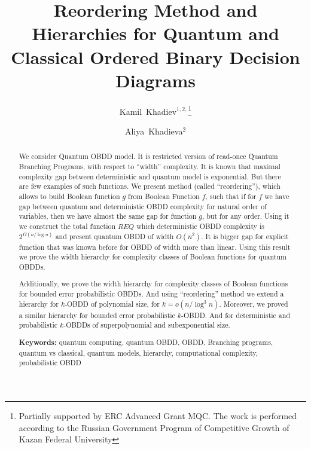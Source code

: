 \documentclass{llncs}
\begin{document}
\title{Reordering Method and Hierarchies for Quantum and Classical Ordered Binary Decision Diagrams}
\author{Kamil~Khadiev$^{1,2,}$\thanks{Partially supported by ERC Advanced Grant MQC. The work is performed according to the Russian Government Program of Competitive Growth of Kazan Federal University}\and Aliya~Khadieva$^2$}


\maketitle

\begin{abstract}
We consider Quantum OBDD model. It is restricted version of read-once Quantum Branching Programs, with respect to ``width'' complexity. It is known that maximal complexity gap between deterministic and quantum model is exponential. But there are few examples of such functions. We present method (called ``reordering''), which allows to build Boolean function $g$ from Boolean Function $f$, such that if for $f$ we have gap between quantum and deterministic OBDD complexity for natural order of variables, then we have almost the same gap for function $g$, but for any order. Using it we construct the total function $REQ$ which deterministic OBDD complexity is $2^{\Omega(n/\log n)}$ and present quantum OBDD of width $O(n^2)$. It is bigger gap for explicit function that was known before for OBDD of width more than linear.
Using this result we prove the width hierarchy for complexity classes of Boolean functions for quantum OBDDs. 

Additionally, we prove the width hierarchy for complexity classes of Boolean functions for bounded error probabilistic OBDDs. And using  ``reordering'' method we extend a hierarchy for $k$-OBDD of polynomial size, for $k=o(n/\log^3n)$. Moreover, we proved a similar hierarchy for bounded error probabilistic $k$-OBDD.  And for deterministic and probabilistic $k$-OBDDs of superpolynomial and subexponential size.

\textbf{Keywords:} quantum computing, quantum OBDD, OBDD, Branching programs, quantum vs classical, quantum models, hierarchy, computational complexity, probabilistic OBDD
\end{abstract}
\end{document}
